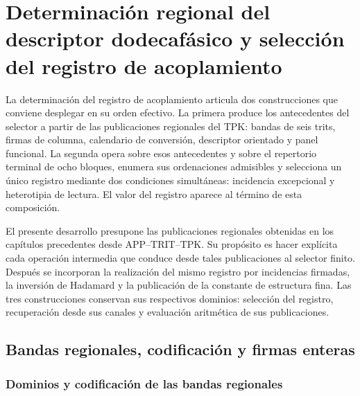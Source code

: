 \chapter{Determinación regional del descriptor dodecafásico y selección del registro de acoplamiento}
\label{chap:despliegue-selector-k}

La determinación del registro de acoplamiento articula dos construcciones
que conviene desplegar en su orden efectivo. La primera produce los
antecedentes del selector a partir de las publicaciones regionales del TPK:
bandas de seis trits, firmas de columna, calendario de conversión,
descriptor orientado y panel funcional. La segunda opera sobre esos
antecedentes y sobre el repertorio terminal de ocho bloques, enumera sus
ordenaciones admisibles y selecciona un único registro mediante dos
condiciones simultáneas: incidencia excepcional y heterotipia de lectura.
El valor del registro aparece al término de esta composición.

El presente desarrollo presupone las publicaciones regionales obtenidas
en los capítulos precedentes desde APP--TRIT--TPK. Su propósito es hacer
explícita cada operación intermedia que conduce desde tales publicaciones
al selector finito. Después se incorporan la realización del mismo
registro por incidencias firmadas, la inversión de Hadamard y la
publicación de la constante de estructura fina. Las tres construcciones
conservan sus respectivos dominios: selección del registro, recuperación
desde sus canales y evaluación aritmética de sus publicaciones.

\section{Bandas regionales, codificación y firmas enteras}

\subsection{Dominios y codificación de las bandas regionales}

